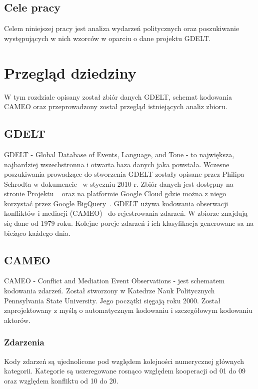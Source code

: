 \documentclass[11pt]{report}
\begin{document}
    \section{Cele pracy}
    Celem niniejszej pracy jest analiza wydarzeń politycznych oraz poszukiwanie występujących w nich wzorców w oparciu o dane projektu GDELT.


    \chapter{Przegląd dziedziny}
    W tym rozdziale opisany został zbiór danych GDELT, schemat kodowania CAMEO oraz przeprowadzony został przegląd istniejących analiz zbioru.


    \section{GDELT}
    GDELT - Global Database of Events, Language, and Tone - to największa, najbardziej wszechstronna i otwarta baza danych jaka powstała.
    Wczesne poszukiwania prowadzące do stworzenia GDELT zostały opisane przez Philipa Schrodta w dokumencie~\cite{Schrodt2010} w styczniu 2010 r.
    Zbiór danych jest dostępny na stronie Projektu ~\cite{gdelt} oraz na platformie Google Cloud gdzie można z niego korzystać przez Google BigQuery~\cite{BigQuery2014}.
    GDELT używa kodowania obserwacji konfliktów i mediacji (CAMEO)~\cite{GDELTDocumentation} do rejestrowania zdarzeń.
    W zbiorze znajdują się dane od 1979 roku.
    Kolejne porcje zdarzeń i ich klasyfikacja generowane sa na bieżąco każdego dnia.


    \section{CAMEO}
    CAMEO - Conflict and Mediation Event Observations - jest schematem kodowania zdarzeń.
    Został stworzony w Katedrze Nauk Politycznych Pennsylvania State University.
    Jego początki sięgają roku 2000.
    Został zaprojektowany z myślą o automatycznym kodowaniu i szczegółowym kodowaniu aktorów.

    \subsection{Zdarzenia}
    Kody zdarzeń są ujednolicone pod względem kolejności numerycznej głównych kategorii.
    Kategorie są uszeregowane rosnąco względem kooperacji od 01 do 09 oraz względem konfliktu od 10 do 20.
\end{document}
